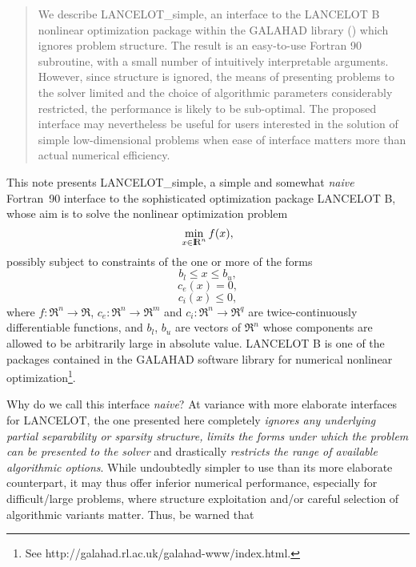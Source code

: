 \documentclass{article}
\begin{document}
\begin{abstract}
We describe {\sf LANCELOT\_simple}, an interface to the {\sf
LANCELOT B} nonlinear optimization package within the {\sf GALAHAD} library
() which ignores problem structure.
The result is an easy-to-use Fortran 90 subroutine, with a small number of
intuitively interpretable arguments.  However, since structure is ignored,
the means of presenting problems to the solver limited and the choice of
algorithmic parameters considerably restricted, the performance is likely
to be sub-optimal.  The proposed interface may nevertheless be useful for users
interested in the solution of simple low-dimensional problems when ease of
interface matters more than actual numerical efficiency.
\end{abstract}


This note presents {\sf LANCELOT\_simple}, a simple and somewhat \emph{naive}
Fortran~90 interface to the sophisticated optimization package
{\sf LANCELOT B}, whose aim is to solve the nonlinear optimization problem
\[
\min_{x \in \hbox{\footnotesize I\hskip -2pt R}^n} f( x ),
\]
possibly subject to constraints of the one or more of the forms
\[
b_l \leq  x \leq b_u,
\]
\[
c_e( x )  = 0,
\]
\[
c_i( x ) \leq 0,
\]
where $f: \Re^n \rightarrow \Re$, $c_e: \Re^n \rightarrow \Re^{m}$ and
$c_i: \Re^n \rightarrow \Re^{q}$ are twice-continuously differentiable
functions, and $b_l$, $b_u$ are vectors of $\Re^n$ whose components are allowed
to be arbitrarily large in absolute value. {\sf LANCELOT B} is one of the
packages contained in the {\sf GALAHAD} software library for numerical
nonlinear
optimization\footnote{See http://galahad.rl.ac.uk/galahad-www/index.html.}.

Why do we call this interface \emph{naive}? At variance with more elaborate
interfaces for {\sf LANCELOT}, the one presented here completely
\emph{ignores any
underlying partial separability or sparsity structure, limits the forms under
which the problem can be presented to the solver} and drastically
\emph{restricts the range of available algorithmic options}. While
undoubtedly simpler to use than its more elaborate counterpart, it may
thus offer inferior
numerical performance, especially for difficult/large
problems, where structure exploitation and/or careful selection of algorithmic
variants matter. Thus, be warned that
\begin{center}
\end{center}
\end{document}
